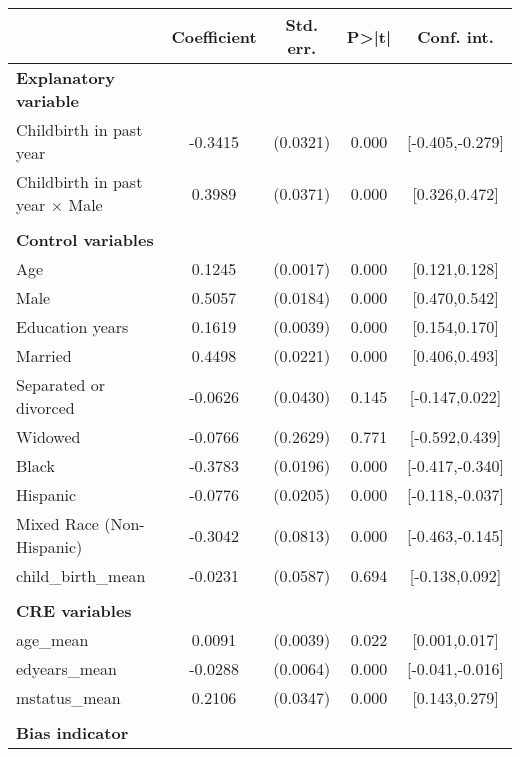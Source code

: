 {
\def\sym#1{\ifmmode^{#1}\else\(^{#1}\)\fi}
\begin{tabular}{l*{1}{cccc}}
\toprule
                    & Coefficient&   Std. err.&       P>|t|&  Conf. int.\\
\midrule
\textbf{Explanatory variable}&            &            &            &            \\
Childbirth in past year&     -0.3415&    (0.0321)&       0.000&[-0.405,-0.279]\\
Childbirth in past year $\times$ Male&      0.3989&    (0.0371)&       0.000&[0.326,0.472]\\
\\ \textbf{Control variables}&            &            &            &            \\
Age                 &      0.1245&    (0.0017)&       0.000&[0.121,0.128]\\
Male                &      0.5057&    (0.0184)&       0.000&[0.470,0.542]\\
Education years     &      0.1619&    (0.0039)&       0.000&[0.154,0.170]\\
Married             &      0.4498&    (0.0221)&       0.000&[0.406,0.493]\\
Separated or divorced&     -0.0626&    (0.0430)&       0.145&[-0.147,0.022]\\
Widowed             &     -0.0766&    (0.2629)&       0.771&[-0.592,0.439]\\
Black               &     -0.3783&    (0.0196)&       0.000&[-0.417,-0.340]\\
Hispanic            &     -0.0776&    (0.0205)&       0.000&[-0.118,-0.037]\\
Mixed Race (Non-Hispanic)&     -0.3042&    (0.0813)&       0.000&[-0.463,-0.145]\\
child\_birth\_mean    &     -0.0231&    (0.0587)&       0.694&[-0.138,0.092]\\
\\ \textbf{CRE variables}&            &            &            &            \\
age\_mean            &      0.0091&    (0.0039)&       0.022&[0.001,0.017]\\
edyears\_mean        &     -0.0288&    (0.0064)&       0.000&[-0.041,-0.016]\\
mstatus\_mean        &      0.2106&    (0.0347)&       0.000&[0.143,0.279]\\
\\ \textbf{Bias indicator}&            &            &            &            \\

\end{tabular}}
